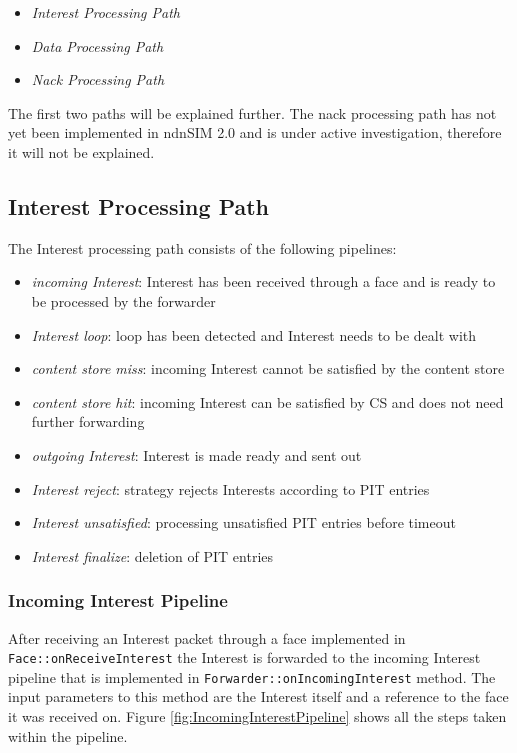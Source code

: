 \begin{itemize}
\item \emph{Interest Processing Path}
\item \emph{Data Processing Path}
\item \emph{Nack Processing Path}
\end{itemize}

The first two paths will be explained further. The nack processing path has not yet been implemented in ndnSIM 2.0 and is under active investigation, therefore it will not be explained.

\subsection{Interest Processing Path}

The Interest processing path consists of the following pipelines:

\begin{itemize}
\item \emph{incoming Interest}: Interest has been received through a face and is ready to be processed by the forwarder
\item \emph{Interest loop}: loop has been detected and Interest needs to be dealt with
\item \emph{content store miss}: incoming Interest cannot be satisfied by the content store
\item \emph{content store hit}: incoming Interest can be satisfied by CS and does not need further forwarding 
\item \emph{outgoing Interest}: Interest is made ready and sent out
\item \emph{Interest reject}: strategy rejects Interests according to PIT entries
\item \emph{Interest unsatisfied}: processing unsatisfied PIT entries before timeout
\item \emph{Interest finalize}: deletion of PIT entries
\end{itemize}

\subsubsection{Incoming Interest Pipeline}

After receiving an Interest packet through a face implemented in \texttt{Face::onReceiveInterest} the Interest is forwarded to the incoming Interest pipeline that is implemented in \texttt{Forwarder::onIncomingInterest} method. The input parameters to this method are the Interest itself and a reference to the face it was received on. Figure \ref{fig:IncomingInterestPipeline} shows all the steps taken within the pipeline.

